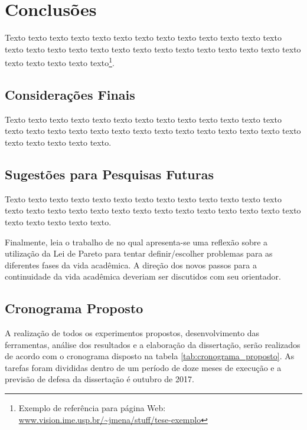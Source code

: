 \chapter{Conclusões}
\label{cap:conclusoes}

Texto texto texto texto texto texto texto texto texto texto texto texto texto
texto texto texto texto texto texto texto texto texto texto texto texto texto
texto texto texto texto texto texto\footnote{Exemplo de referência para página
Web: \url{www.vision.ime.usp.br/~jmena/stuff/tese-exemplo}}.

\section{Considerações Finais} 

Texto texto texto texto texto texto texto texto texto texto texto texto texto
texto texto texto texto texto texto texto texto texto texto texto texto texto
texto texto texto texto texto texto. 

\section{Sugestões para Pesquisas Futuras} 

Texto texto texto texto texto texto texto texto texto texto texto texto texto
texto texto texto texto texto texto texto texto texto texto texto texto texto
texto texto texto texto texto texto.

Finalmente, leia o trabalho de \citet{alon09:how} no qual apresenta-se
uma reflexão sobre a utilização da Lei de Pareto para tentar definir/escolher
problemas para as diferentes fases da vida acadêmica.  A direção dos novos
passos para a continuidade da vida acadêmica deveriam ser discutidos com seu
orientador.

\section{Cronograma Proposto}
A realização de todos os experimentos propostos, desenvolvimento das ferramentas, análise dos resultados e a elaboração da dissertação, serão realizados de acordo com o cronograma disposto na tabela \ref{tab:cronograma_proposto}. As tarefas foram divididas dentro de um período de doze meses de execução e a previsão de defesa da dissertação é outubro de 2017.

